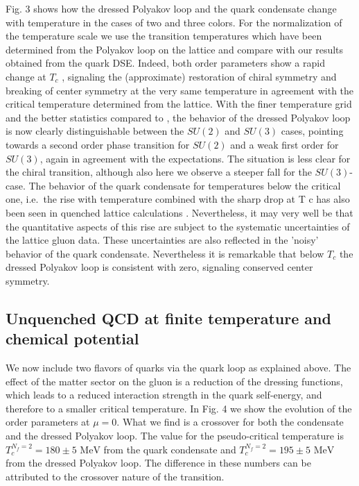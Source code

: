 \documentclass[a4paper,fleqn]{cas-dc}
\begin{document}
Fig. 3 shows how the dressed Polyakov loop and the quark condensate change with temperature in the cases of two
and three colors. For the normalization of the temperature scale we use the transition temperatures which have been
determined from the Polyakov loop on the lattice and compare with our results obtained from the quark DSE. Indeed, both
order parameters show a rapid change at $T_c$ , signaling the (approximate) restoration of chiral symmetry and breaking of
center symmetry at the very same temperature in agreement with the critical temperature determined from the lattice.
With the finer temperature grid and the better statistics compared to \cite{Fischer2010}, the behavior of the dressed Polyakov loop is now
clearly distinguishable between the $SU ( 2 )$ and $SU ( 3 )$ cases, pointing towards a second order phase transition for $SU ( 2 )$ and
a weak first order for $SU ( 3 )$, again in agreement with the expectations. The situation is less clear for the chiral transition,
although also here we observe a steeper fall for the $SU ( 3 )$-case. The behavior of the quark condensate for temperatures
below the critical one, i.e.\ the rise with temperature combined with the sharp drop at T c has also been seen in quenched
lattice calculations \cite{PhysRevD.78.074505}. Nevertheless, it may very well be that the quantitative aspects of this rise are subject to the
systematic uncertainties of the lattice gluon data. These uncertainties are also reflected in the 'noisy' behavior of the
quark condensate. Nevertheless it is remarkable that below $T_c$ the dressed Polyakov loop is consistent with zero, signaling
conserved center symmetry.

\subsection{Unquenched QCD at finite temperature and chemical potential}
We now include two flavors of quarks via the quark loop as explained above. The effect of the matter sector on the
gluon is a reduction of the dressing functions, which leads to a reduced interaction strength in the quark self-energy, and
therefore to a smaller critical temperature. In Fig. 4 we show the evolution of the order parameters at $\mu = 0$. What we
find is a crossover for both the condensate and the dressed Polyakov loop. The value for the pseudo-critical temperature is
$T_c^{N_f = 2} = 180 \pm 5 \text{ MeV}$ from the quark condensate and 
$T_c^{N_f = 2} = 195 \pm 5 \text{ MeV}$ from the dressed Polyakov loop. The difference
in these numbers can be attributed to the crossover nature of the transition.
\end{document}
